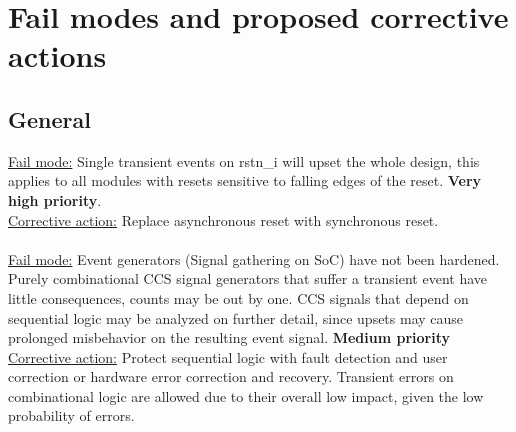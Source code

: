 \newpage
\section{Fail modes and proposed corrective actions}
\label{chapter2}
\subsection{General}
\underline{Fail mode:} Single transient events on rstn\_i will upset the whole design, this applies to all modules with resets sensitive to falling edges of the reset. \textbf{Very high priority}.\\
\underline{Corrective action:} Replace asynchronous reset with synchronous reset.\\
\\
\underline{Fail mode:} Event generators (Signal gathering on SoC) have not been hardened. Purely combinational  CCS signal generators that suffer a transient event have little consequences, counts may be out by one. CCS signals that depend on sequential logic may be analyzed on further detail, since upsets may cause prolonged misbehavior on the resulting event signal. \textbf{Medium priority}\\
\underline{Corrective action:} Protect sequential logic with fault detection and user correction or hardware error correction and recovery. Transient errors on combinational logic are allowed due to their overall low impact, given the low probability of errors. 

